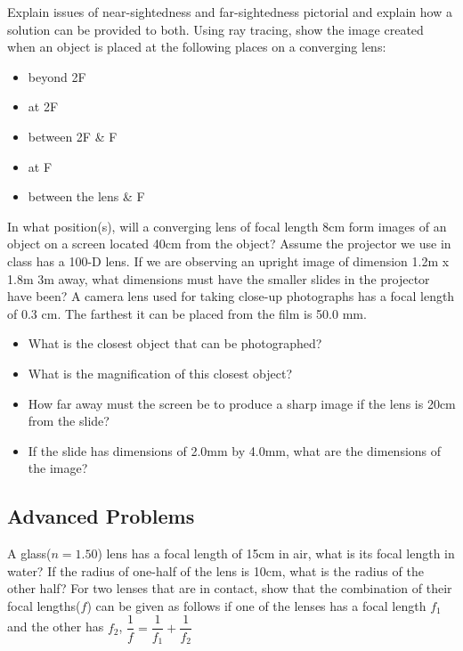 \documentclass[11pt,addpoints]{exam}
\begin{document}
	\begin{questions}
		\question Explain issues of near-sightedness and far-sightedness pictorial and explain how a solution can be provided to both.
		\question Using ray tracing, show the image created when an object is placed at the following places on a converging lens:
		\begin{itemize}
			\item beyond 2F
			\item at 2F
			\item between 2F \& F
			\item at F
			\item between the lens \& F
		\end{itemize}
		\question In what position(s), will a converging lens of focal length 8cm form images of an object on a screen located 40cm from the object?
		\question Assume the projector we use in class has a 100-D lens. If we are observing an upright image of dimension 1.2m x 1.8m 3m away, what dimensions must have the smaller slides in the projector have been?
		\question A camera lens used for taking close-up photographs has a focal length of 0.3 cm. The farthest it can be placed from the film is 50.0 mm.
		\begin{itemize}
			\item What is the closest object that can be photographed?
			\item What is the magnification of this closest object?
		\end{itemize}
		
		
		
		
		\begin{itemize}
			\item How far away must the screen be to produce a sharp image if the lens is 20cm from the slide?
			\item If the slide has dimensions of 2.0mm by 4.0mm, what are the dimensions of the image?
		\end{itemize}
		\subsection*{Advanced Problems}
		\question A glass($n=1.50$) lens has a focal length of 15cm in air, what is its focal length in water? If the radius of one-half of the lens is 10cm, what is the radius of the other half?
		\question For two lenses that are in contact, show that the combination of their focal lengths($f$) can  be given as follows if one of the lenses has a focal length $f_1$ and the other has $f_2$, $\dfrac{1}{f}=\dfrac{1}{f_1}+\dfrac{1}{f_2}$
	\end{questions}		
\end{document}
